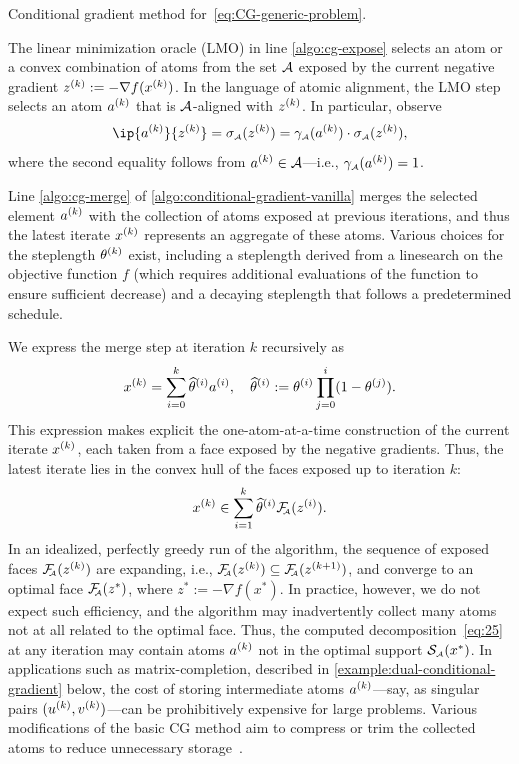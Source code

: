 \begin{algorithm}[t]
  \DontPrintSemicolon\setcounter{AlgoLine}{-1}
  \caption{Conditional gradient method for~\eqref{eq:CG-generic-problem}.\label{algo:conditional-gradient-vanilla}}
\end{algorithm}

The linear minimization oracle (LMO) in line \ref{algo:cg-expose} selects an atom or
a convex combination of atoms from the set $\mathcal{A}$ exposed by the current
negative gradient $z^{(k)}:=-\nabla f(x^{(k)})$. In the language of atomic alignment,
the LMO step selects an atom $a^{(k)}$ that is $\mathcal{A}$-aligned with $z^{(k)}$. In
particular, observe
\[
  \ip{a\k}{z\k} = \sigma\As(z\k) = \gauge\As(a\k)\cdot\sigma\As(z\k),
\]
where the second equality follows from $a^{(k)}\in\mathcal{A}$---i.e., $\gamma_{\scriptscriptstyle\mathcal{A}}(a^{(k)})=1$.

Line \ref{algo:cg-merge} of \autoref{algo:conditional-gradient-vanilla} merges the
selected element $a^{(k)}$ with the collection of atoms exposed at previous
iterations, and thus the latest iterate $x^{(k)}$ represents an aggregate of these
atoms. Various choices for the steplength $\theta^{(k)}$ exist, including a
steplength derived from a linesearch on the objective function $f$ (which
requires additional evaluations of the function to ensure sufficient decrease)
and a decaying steplength that follows a predetermined schedule.

We express the merge step at iteration $k$ recursively as
\begin{equation}
  \label{eq:25}  x^{(k)} = \sum_{i=0}^k\widehat\theta^{(i)}a^{(i)},
  \quad
  \widehat\theta^{(i)}:=\theta^{(i)}\prod_{j=0}^i(1-\theta^{(j)}).
\end{equation}
This expression makes explicit the one-atom-at-a-time construction of the
current iterate $x^{(k)}$, each taken from a face exposed by the negative gradients.
Thus, the latest iterate lies in the convex hull of the faces exposed up to
iteration $k$:
\[
  x^{(k)} \in \sum_{i=1}^k\widehat\theta^{(i)}\mathcal{F}_{\!\!\scriptscriptstyle\mathcal{A}}(z^{(i)}).
\]
In an idealized, perfectly greedy run of the algorithm, the sequence of exposed
faces $\mathcal{F}_{\!\!\scriptscriptstyle\mathcal{A}}(z^{(k)})$ are expanding, i.e., $\mathcal{F}_{\!\!\scriptscriptstyle\mathcal{A}}(z^{(k)})\subseteq\mathcal{F}_{\!\!\scriptscriptstyle\mathcal{A}}(z^{(k+1)})$,
and converge to an optimal face $\mathcal{F}_{\!\!\scriptscriptstyle\mathcal{A}}(z^*)$, where $z^*:=-\nabla f(x^*)$. In
practice, however, we do not expect such efficiency, and the algorithm may
inadvertently collect many atoms not at all related to the optimal face. Thus,
the computed decomposition~\eqref{eq:25} at any iteration may contain atoms
$a^{(k)}$ not in the optimal support $\operatorname{\mathcal{S}_{\scriptscriptstyle\mathcal{A}}}(x^*)$. In applications such as
matrix-completion, described in \autoref{example:dual-conditional-gradient} below,
the cost of storing intermediate atoms $a^{(k)}$---say, as singular pairs
$(u^{(k)},v^{(k)})$---can be prohibitively expensive for large problems. Various
modifications of the basic CG method aim to compress or trim the collected atoms
to reduce unnecessary storage~\cite{rao2015forward}.

